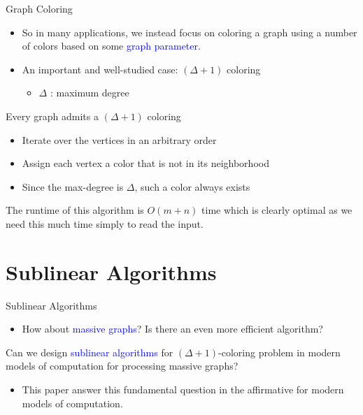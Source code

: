 \documentclass[aspectratio=169,xcolor=dvipsnames]{beamer}
\begin{document}
	\begin{frame}{Graph Coloring}
		\begin{itemize}
			\item So in many applications, we instead focus on coloring a graph using a number of colors based on some \textcolor{blue}{graph parameter}.
			\item An important and well-studied case: \alert{$(\Delta + 1)$} coloring
			\begin{itemize}
				\item \alert{$\Delta$} : maximum degree
			\end{itemize}
		\end{itemize}
		\begin{block}{}
			Every graph admits a \alert{$(\Delta+1)$} coloring
		\end{block}
		\begin{itemize}
			\item Iterate over the vertices in an arbitrary order
			\item Assign each vertex a color that is not in its neighborhood
			\item Since the max-degree is \alert{$\Delta$}, such a color always exists
		\end{itemize}
		The runtime of this algorithm is \alert{$O(m+n)$} time which is clearly optimal as we need this much time simply to read the input.
	\end{frame}
	
	\section{Sublinear Algorithms}
	
	\begin{frame}{Sublinear Algorithms}
		\begin{itemize}
			\item How about \textcolor{blue}{massive graphs}? Is there an even more efficient algorithm?
		\end{itemize}
		
		\begin{alertblock}{}
			Can we design \textcolor{blue}{sublinear algorithms} for \alert{$(\Delta + 1)$}-coloring problem in modern models
			of computation for processing massive graphs?
		\end{alertblock}
		
		\begin{itemize}
			\item This paper answer this fundamental question in the affirmative for modern models of computation.
		\end{itemize}
		
	\end{frame}
	
\end{document}

